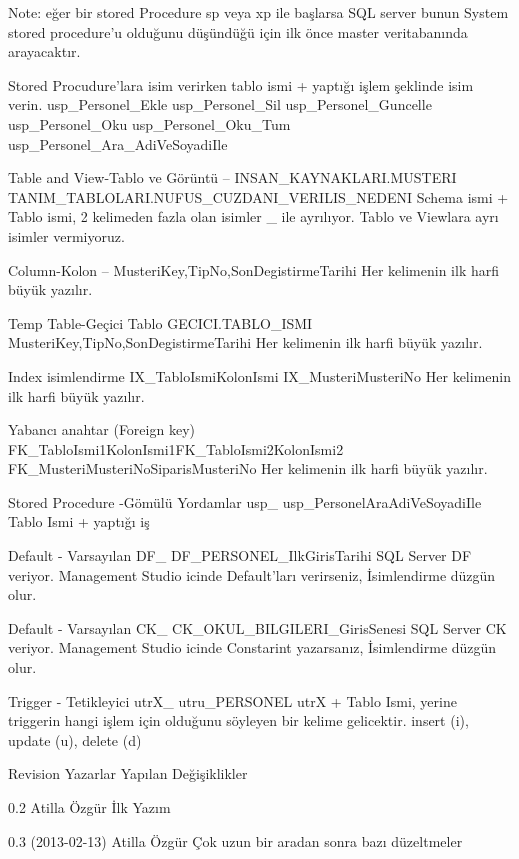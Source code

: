 \documentclass[10pt,a4paper,draft]{article}
\begin{document}
  
  Note: eğer bir 
  stored Procedure sp veya xp ile başlarsa SQL server 			bunun System stored 
  procedure'u olduğunu düşündüğü için ilk önce master veritabanında arayacaktır. 
  
  
  Stored Procudure'lara isim verirken tablo ismi + yaptığı işlem şeklinde 
  isim verin.
		usp\_Personel\_Ekle			usp\_Personel\_Sil			 
		usp\_Personel\_Guncelle		usp\_Personel\_Oku			 
		usp\_Personel\_Oku\_Tum		usp\_Personel\_Ara\_AdiVeSoyadiIle
  
     Table and View-Tablo ve Görüntü 
     -- 
    INSAN\_KAYNAKLARI.MUSTERI 
      			TANIM\_TABLOLARI.NUFUS\_CUZDANI\_VERILIS\_NEDENI 
    Schema ismi + Tablo ismi, 2 kelimeden fazla olan isimler \_ ile 
      ayrılıyor. Tablo ve Viewlara ayrı isimler vermiyoruz.		  
  
     Column-Kolon 
     -- 
    MusteriKey,TipNo,SonDegistirmeTarihi 
    Her kelimenin ilk harfi büyük yazılır. 
  
     Temp Table-Geçici Tablo 
     GECICI.TABLO\_ISMI 
    MusteriKey,TipNo,SonDegistirmeTarihi 
    Her kelimenin ilk harfi büyük yazılır. 
  
     Index isimlendirme 
     IX\_TabloIsmiKolonIsmi 
     IX\_MusteriMusteriNo 
    Her kelimenin ilk harfi büyük yazılır. 
  
     Yabancı anahtar (Foreign key) 
     FK\_TabloIsmi1KolonIsmi1FK\_TabloIsmi2KolonIsmi2 
     FK\_MusteriMusteriNoSiparisMusteriNo 
    Her kelimenin ilk harfi büyük yazılır. 
  
     Stored Procedure -Gömülü Yordamlar 
     usp\_ 
     usp\_PersonelAraAdiVeSoyadiIle 
     Tablo Ismi + yaptığı iş 		  
  
    Default - Varsayılan 
     DF\_ 
     DF\_PERSONEL\_IlkGirisTarihi 
     SQL Server DF veriyor. Management Studio icinde Default'ları 
      verirseniz, İsimlendirme düzgün olur. 		  
  
     Default - Varsayılan 
     CK\_ 
     CK\_OKUL\_BILGILERI\_GirisSenesi 
     SQL Server CK veriyor. Management Studio icinde Constarint 
      yazarsanız, İsimlendirme düzgün olur. 				 
  
     Trigger - Tetikleyici 
     utrX\_ 
     utru\_PERSONEL 
      utrX + Tablo Ismi, yerine triggerin hangi işlem için olduğunu 
      söyleyen bir kelime gelicektir. insert (i), update (u), delete (d)
  

  
      
      
Revision 
Yazarlar 
Yapılan Değişiklikler 
  
     0.2  
     Atilla Özgür 
    İlk Yazım 
    
  
     0.3 (2013-02-13) 
     Atilla Özgür 
    Çok uzun bir aradan sonra bazı düzeltmeler 
    
    
\end{document}

